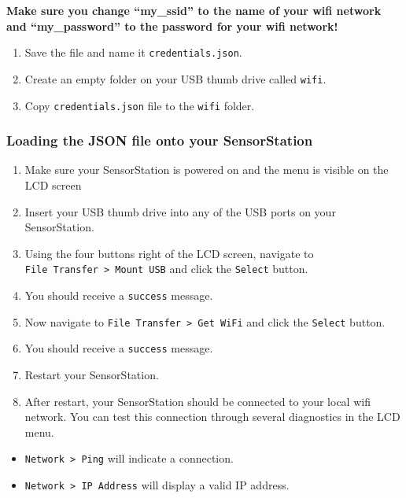 \documentclass[
]{article}
\providecommand{\tightlist}{%
  \setlength{\itemsep}{0pt}\setlength{\parskip}{0pt}}
\begin{document}
\textbf{Make sure you change ``my\_ssid'' to the name of your wifi
network and ``my\_password'' to the password for your wifi network!}

\begin{enumerate}
\def\labelenumi{\arabic{enumi}.}
\setcounter{enumi}{2}
\tightlist
\item
  Save the file and name it \texttt{credentials.json}.
\item
  Create an empty folder on your USB thumb drive called \texttt{wifi}.
\item
  Copy \texttt{credentials.json} file to the \texttt{wifi} folder.
\end{enumerate}

\hypertarget{loading-the-json-file-onto-your-sensorstation}{%
\subsubsection{Loading the JSON file onto your
SensorStation}\label{loading-the-json-file-onto-your-sensorstation}}

\begin{enumerate}
\def\labelenumi{\arabic{enumi}.}
\tightlist
\item
  Make sure your SensorStation is powered on and the menu is visible on
  the LCD screen
\item
  Insert your USB thumb drive into any of the USB ports on your
  SensorStation.
\item
  Using the four buttons right of the LCD screen, navigate to
  \texttt{File\ Transfer\ \textgreater{}\ Mount\ USB} and click the
  \texttt{Select} button.
\item
  You should receive a \texttt{success} message.
\item
  Now navigate to \texttt{File\ Transfer\ \textgreater{}\ Get\ WiFi} and
  click the \texttt{Select} button.
\item
  You should receive a \texttt{success} message.
\item
  Restart your SensorStation.
\item
  After restart, your SensorStation should be connected to your local
  wifi network. You can test this connection through several diagnostics
  in the LCD menu.
\end{enumerate}

\begin{itemize}
\tightlist
\item
  \texttt{Network\ \textgreater{}\ Ping} will indicate a connection.
\item
  \texttt{Network\ \textgreater{}\ IP\ Address} will display a valid IP
  address.
\end{itemize}
\end{document}
